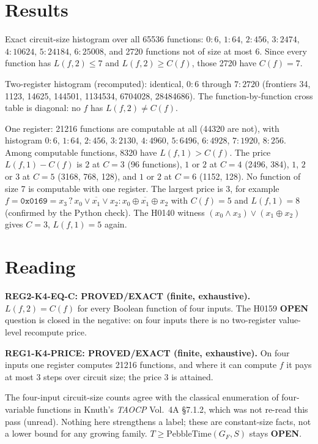 \documentclass[11pt]{article}
\begin{document}
\section*{Results}
Exact circuit-size histogram over all 65536 functions: $0{:}6$, $1{:}64$, $2{:}456$, $3{:}2474$, $4{:}10624$, $5{:}24184$, $6{:}25008$, and 2720 functions not of size at most 6. Since every function has $L(f,2)\le7$ and $L(f,2)\ge C(f)$, those 2720 have $C(f)=7$.

Two-register histogram (recomputed): identical, $0{:}6$ through $7{:}2720$ (frontiers 34, 1123, 14625, 144501, 1134534, 6704028, 28484686). The function-by-function cross table is diagonal: no $f$ has $L(f,2)\ne C(f)$.

One register: 21216 functions are computable at all (44320 are not), with histogram $0{:}6$, $1{:}64$, $2{:}456$, $3{:}2130$, $4{:}4960$, $5{:}6496$, $6{:}4928$, $7{:}1920$, $8{:}256$. Among computable functions, 8320 have $L(f,1)>C(f)$. The price $L(f,1)-C(f)$ is $2$ at $C=3$ (96 functions), $1$ or $2$ at $C=4$ (2496, 384), $1$, $2$ or $3$ at $C=5$ (3168, 768, 128), and $1$ or $2$ at $C=6$ (1152, 128). No function of size 7 is computable with one register. The largest price is 3, for example $f=\texttt{0x0169}=x_3\,?\,\overline{x_0\vee x_1\vee x_2}:\overline{x_0\oplus x_1\oplus x_2}$ with $C(f)=5$ and $L(f,1)=8$ (confirmed by the Python check). The H0140 witness $(x_0\wedge x_3)\vee(x_1\oplus x_2)$ gives $C=3$, $L(f,1)=5$ again.

\section*{Reading}
\textbf{REG2-K4-EQ-C: PROVED/EXACT (finite, exhaustive).} $L(f,2)=C(f)$ for every Boolean function of four inputs. The H0159 \textbf{OPEN} question is closed in the negative: on four inputs there is no two-register value-level recompute price.

\textbf{REG1-K4-PRICE: PROVED/EXACT (finite, exhaustive).} On four inputs one register computes 21216 functions, and where it can compute $f$ it pays at most $3$ steps over circuit size; the price 3 is attained.

The four-input circuit-size counts agree with the classical enumeration of four-variable functions in Knuth's \emph{TAOCP} Vol.~4A \S7.1.2, which was not re-read this pass (unread). Nothing here strengthens a label; these are constant-size facts, not a lower bound for any growing family. $T\ge\mathrm{PebbleTime}(G_F,S)$ stays \textbf{OPEN}.
\end{document}
